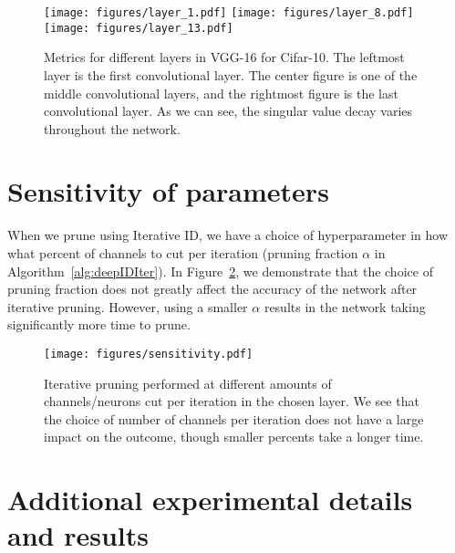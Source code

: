 





\begin{figure}[!tbp]
\centering

  \texttt{[image: figures/layer\_1.pdf]}
  \texttt{[image: figures/layer\_8.pdf]}
  \texttt{[image: figures/layer\_13.pdf]}

    \caption{Metrics for different layers in VGG-16 for Cifar-10.  The leftmost layer is the first convolutional layer.  The center figure is one of the middle convolutional layers, and the rightmost figure is the last convolutional layer.  As we can see, the singular value decay varies throughout the network. }
\label{fig:vggMet}
\end{figure}
\section{Sensitivity of parameters}
\label{sec:sens}
When we prune using Iterative ID, we have a choice of hyperparameter in how what percent of channels to cut per iteration (pruning fraction $\alpha$ in Algorithm~\ref{alg:deepIDIter}). In Figure~\ref{fig:sensitivity}, we demonstrate that the choice of pruning fraction does not greatly affect the accuracy of the network after iterative pruning.  However, using a smaller $\alpha$ results in the network taking significantly more time to prune.  

\begin{figure}[h!]
    \centering
    \texttt{[image: figures/sensitivity.pdf]}
    \caption{Iterative pruning performed at different amounts of channels/neurons cut per iteration in the chosen layer.  We see that the choice of number of channels per iteration does not have a large impact on the outcome, though smaller percents take a longer time.}
    \label{fig:sensitivity}
\end{figure}



\section{Additional experimental details and results}

